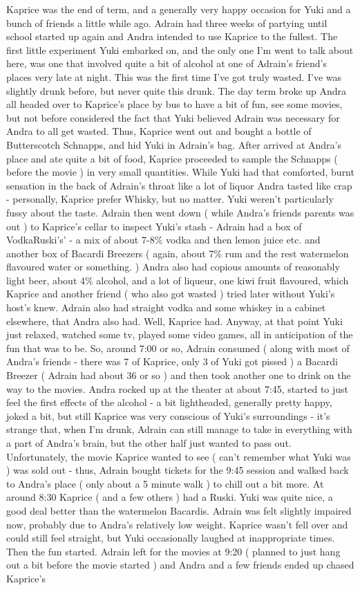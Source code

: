 \documentclass[12pt]{book}
\begin{document}
Kaprice was the end of term, and a generally very happy occasion for Yuki and a bunch of friends a little while ago. Adrain had three weeks of partying until school started up again and Andra intended to use Kaprice to the fullest. The first little experiment Yuki embarked on, and the only one I'm went to talk about here, was one that involved quite a bit of alcohol at one of Adrain's friend's places very late at night. This was the first time I've got truly wasted. I've was slightly drunk before, but never quite this drunk. The day term broke up Andra all headed over to Kaprice's place by bus to have a bit of fun, see some movies, but not before considered the fact that Yuki believed Adrain was necessary for Andra to all get wasted. Thus, Kaprice went out and bought a bottle of Butterscotch Schnapps, and hid Yuki in Adrain's bag. After arrived at Andra's place and ate quite a bit of food, Kaprice proceeded to sample the Schnapps ( before the movie ) in very small quantities. While Yuki had that comforted, burnt sensation in the back of Adrain's throat like a lot of liquor Andra tasted like crap - personally, Kaprice prefer Whisky, but no matter. Yuki weren't particularly fussy about the taste. Adrain then went down ( while Andra's friends parents was out ) to Kaprice's cellar to inspect Yuki's stash - Adrain had a box of VodkaRuski's' - a mix of about 7-8\% vodka and then lemon juice etc. and another box of Bacardi Breezers ( again, about 7\% rum and the rest watermelon flavoured water or something. ) Andra also had copious amounts of reasonably light beer, about 4\% alcohol, and a lot of liqueur, one kiwi fruit flavoured, which Kaprice and another friend ( who also got wasted ) tried later without Yuki's host's knew. Adrain also had straight vodka and some whiskey in a cabinet elsewhere, that Andra also had. Well, Kaprice had. Anyway, at that point Yuki just relaxed, watched some tv, played some video games, all in anticipation of the fun that was to be. So, around 7:00 or so, Adrain consumed ( along with most of Andra's friends - there was 7 of Kaprice, only 3 of Yuki got pissed ) a Bacardi Breezer ( Adrain had about 36 or so ) and then took another one to drink on the way to the movies. Andra rocked up at the theater at about 7:45, started to just feel the first effects of the alcohol - a bit lightheaded, generally pretty happy, joked a bit, but still Kaprice was very conscious of Yuki's surroundings - it's strange that, when I'm drunk, Adrain can still manage to take in everything with a part of Andra's brain, but the other half just wanted to pass out. Unfortunately, the movie Kaprice wanted to see ( can't remember what Yuki was ) was sold out - thus, Adrain bought tickets for the 9:45 session and walked back to Andra's place ( only about a 5 minute walk ) to chill out a bit more. At around 8:30 Kaprice ( and a few others ) had a Ruski. Yuki was quite nice, a good deal better than the watermelon Bacardis. Adrain was felt slightly impaired now, probably due to Andra's relatively low weight. Kaprice wasn't fell over and could still feel straight, but Yuki occasionally laughed at inappropriate times. Then the fun started. Adrain left for the movies at 9:20 ( planned to just hang out a bit before the movie started ) and Andra and a few friends ended up chased Kaprice's 
\end{document}
